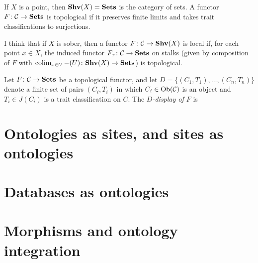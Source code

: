 \documentclass{amsart}
\def\Shv{{\bf Shv}}
\begin{document}
\begin{example}

If $X$ is a point, then $\Shv(X)=\Sets$ is the category of sets.  A functor $F\colon\mathcal{C}\rightarrow{\bf Sets}$ is topological if it preserves finite limits and takes trait classifications to surjections.

I think that if $X$ is sober, then a functor $F\taking\mcC\to\Shv(X)$ is local if, for each point $x\in X$, the induced functor $F_x\colon\mathcal{C}\rightarrow{\bf Sets}$ on stalks (given by composition of $F$ with $\colim_{x\in U}-(U)\taking\Shv(X)\to\Sets$) is topological.

\end{example}

\begin{definition}

Let $F\colon\mathcal{C}\rightarrow{\bf Sets}$ be a topological functor, and let $D=\{(C_1,T_1),\ldots,(C_n,T_n)\}$ denote a finite set of pairs $(C_i,T_i)$ in which $C_i\in\textnormal{Ob}(\mathcal{C})$ is an object and $T_i\in J(C_i)$ is a trait classification on $C$.  The {\em $D$-display of $F$} is 

\end{definition}

\section{Ontologies as sites, and sites as ontologies}\label{sec:connections}
\section{Databases as ontologies}\label{sec:databases}
\section{Morphisms and ontology integration}\label{sec:integration}
\end{document}
